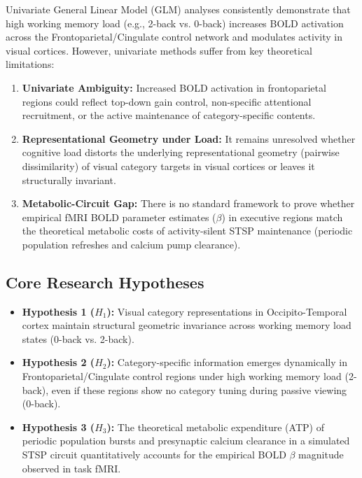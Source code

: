 \documentclass[11pt,a4paper]{article}
\begin{document}
Univariate General Linear Model (GLM) analyses consistently demonstrate that high working memory load (e.g., 2-back vs. 0-back) increases BOLD activation across the Frontoparietal/Cingulate control network and modulates activity in visual cortices. However, univariate methods suffer from key theoretical limitations:

\begin{enumerate}
    \item \textbf{Univariate Ambiguity:} Increased BOLD activation in frontoparietal regions could reflect top-down gain control, non-specific attentional recruitment, or the active maintenance of category-specific contents.
    \item \textbf{Representational Geometry under Load:} It remains unresolved whether cognitive load distorts the underlying representational geometry (pairwise dissimilarity) of visual category targets in visual cortices or leaves it structurally invariant.
    \item \textbf{Metabolic-Circuit Gap:} There is no standard framework to prove whether empirical fMRI BOLD parameter estimates ($\beta$) in executive regions match the theoretical metabolic costs of activity-silent STSP maintenance (periodic population refreshes and calcium pump clearance).
\end{enumerate}

\subsection*{Core Research Hypotheses}

\begin{itemize}
    \item \textbf{Hypothesis 1 ($H_1$):} Visual category representations in Occipito-Temporal cortex maintain structural geometric invariance across working memory load states (0-back vs. 2-back).
    \item \textbf{Hypothesis 2 ($H_2$):} Category-specific information emerges dynamically in Frontoparietal/Cingulate control regions under high working memory load (2-back), even if these regions show no category tuning during passive viewing (0-back).
    \item \textbf{Hypothesis 3 ($H_3$):} The theoretical metabolic expenditure (ATP) of periodic population bursts and presynaptic calcium clearance in a simulated STSP circuit quantitatively accounts for the empirical BOLD $\beta$ magnitude observed in task fMRI.
\end{itemize}
\end{document}

